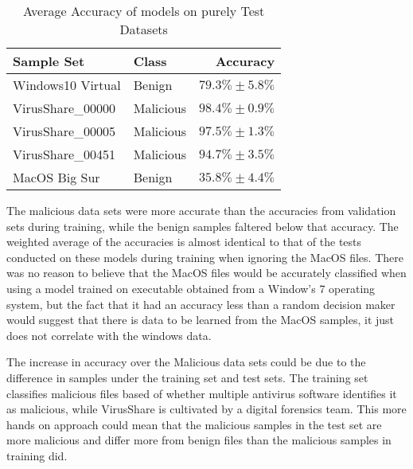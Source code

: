 \begin{table}[H]
    \begin{center}
        \captionsetup{justification=centering}
        \caption{Average Accuracy of models on purely Test Datasets}
        \begin{tabular}{l|l|r}
            \textbf{Sample Set} & \textbf{Class} & \textbf{Accuracy}\\
            \hline
            Windows10 Virtual & Benign & $79.3\% \pm 5.8\%$\\
            VirusShare\_00000 & Malicious & $98.4\% \pm 0.9\%$\\
            VirusShare\_00005 & Malicious & $97.5\% \pm 1.3\%$\\
            VirusShare\_00451 & Malicious & $94.7\% \pm 3.5\%$\\
            MacOS Big Sur & Benign & $35.8\% \pm 4.4\%$\\
        \end{tabular}
        \label{tab:testTable}
    \end{center}
\end{table}

The malicious data sets were more accurate than the accuracies from validation sets during training,
while the benign samples faltered below that accuracy.
The weighted average of the accuracies is almost identical to that of the tests conducted on these models during training
when ignoring the MacOS files.
There was no reason to believe that the MacOS files would be accurately classified when using a model trained on
executable obtained from a Window’s 7 operating system\cite{lester}, but the fact that it had an accuracy
less than a random decision maker would suggest that there is data to be learned from the MacOS
samples, it just does not correlate with the windows data.

The increase in accuracy over the Malicious data sets could be due to the difference in samples under the
training set and test sets.
The training set classifies malicious files based of whether multiple antivirus software identifies it as
malicious\cite{lester}, while VirusShare is cultivated by a digital forensics team\cite{virusShare1,virusShare5,virusShare451}.
This more hands on approach could mean that the malicious samples in the test set are more malicious and differ more
from benign files than the malicious samples in training did.


